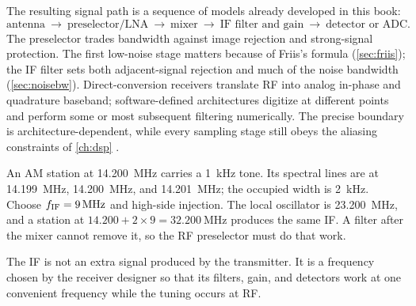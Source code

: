 The resulting signal path is a sequence of models already developed in this book:
\[
\text{antenna}\ \longrightarrow\ \text{preselector/LNA}\ \longrightarrow\
\text{mixer}\ \longrightarrow\ \text{IF filter and gain}\ \longrightarrow\
\text{detector or ADC}.
\]
The preselector trades bandwidth against image rejection and strong-signal
protection.  The first low-noise stage matters because of Friis's formula
(\cref{sec:friis}); the IF filter sets both adjacent-signal rejection and much of
the noise bandwidth (\cref{sec:noisebw}). Direct-conversion receivers translate RF
into analog in-phase and quadrature baseband; software-defined architectures digitize
at different points and perform some or most subsequent filtering numerically. The
precise boundary is architecture-dependent, while every sampling stage still obeys
the aliasing constraints of \cref{ch:dsp}
\cite[pp.~23--26]{giannini2008baseband}.

\begin{workedbox}
An AM station at \SI{14.200}{\mega\hertz} carries a \SI{1}{\kilo\hertz} tone.
Its spectral lines are at \SI{14.199}{\mega\hertz}, \SI{14.200}{\mega\hertz},
and \SI{14.201}{\mega\hertz}; the occupied width is \SI{2}{\kilo\hertz}.
Choose \(f_{\rm IF}=\SI{9}{\mega\hertz}\) and high-side injection.  The local
oscillator is \SI{23.200}{\mega\hertz}, and a station at
\(14.200+2\times9=\SI{32.200}{\mega\hertz}\) produces the same IF.  A filter
after the mixer cannot remove it, so the RF preselector must do that work.
\end{workedbox}

\begin{mistakebox}
The IF is not an extra signal produced by the transmitter.  It is a frequency
chosen by the receiver designer so that its filters, gain, and detectors work at
one convenient frequency while the tuning occurs at RF.
\end{mistakebox}
